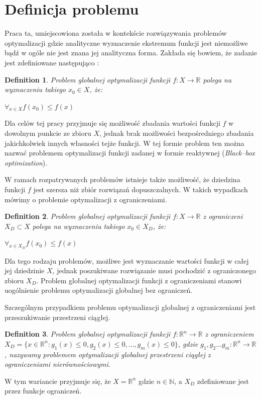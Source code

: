 \documentclass[12pt,a4paper]{report}
\begin{document}
\section{Definicja problemu}
\label{ProblemDefinition}
\par{
Praca ta, umiejscowiona została w kontekście rozwiązywania problemów optymalizacji gdzie analityczne wyznaczenie ekstremum funkcji jest niemożliwe bądź w ogóle nie jest znana jej analityczna forma. Zakłada się bowiem, że zadanie jest zdefiniowane następująco \cite{StrojnowskiOptymalizacja2}:
}
\newtheorem{OptDefinition}{Definition}
\par{
\begin{OptDefinition}
Problem globalnej optymalizacji funkcji $f: X \rightarrow \mathbb{R}$ polega na wyznaczeniu takiego $x_0 \in X$, że:
\begin{center}
	$\forall_{x \in X} f(x_0) \leq f(x)$
\end{center}
\end{OptDefinition}
\par{
Dla celów tej pracy przyjmuje się możliwość zbadania wartości funkcji $f$ w dowolnym punkcie ze zbioru $X$, jednak brak możliwości bezpośredniego zbadania jakichkolwiek innych własności tejże funkcji. W tej formie problem ten można nazwać problemem optymalizacji funkcji zadanej w formie reaktywnej (\emph{Black--box optimization}).
}
\par{
W ramach rozpatrywanych problemów istnieje także możliwość, że dziedzina funkcji $f$ jest szersza niż zbiór rozwiązań dopuszczalnych. W takich wypadkach mówimy o problemie optymalizacji z ograniczeniami.
\begin{OptDefinition}
Problem globalnej optymalizacji funkcji $f: X \rightarrow \mathbb{R}$ z ograniczeni $X_D \subset X$ polega na wyznaczeniu takiego $x_0 \in X_D$, że:
\begin{center}
	$\forall_{x \in X_D} f(x_0) \leq f(x)$
\end{center}
\end{OptDefinition}
Dla tego rodzaju problemów, możliwe jest wyznaczanie wartości funkcji w całej jej dziedzinie $X$, jednak poszukiwane rozwiązanie musi pochodzić z ograniczonego zbioru $X_D$.
Problem globalnej optymalizacji funkcji z ograniczeniami stanowi uogólnienie problemu optymalizacji globalnej bez ograniczeń.
}
\par{
Szczególnym przypadkiem problemu optymalizacji globalnej z ograniczeniami jest przeszukiwanie przestrzeni ciągłej. 
\begin{OptDefinition}
Problem globalnej optymalizacji funkcji $f: \mathbb{R}^n \rightarrow \mathbb{R}$ z ograniczeniem $X_D = \{x \in \mathbb{R}^n: g_1(x) \leq 0, g_2(x) \leq 0, \ldots, g_m(x) \leq 0\}$, gdzie $g_1, g_2 \ldots g_m: \mathbb{R}^n \rightarrow \mathbb{R}$, nazywamy problemem optymalizacji globalnej przestrzeni ciągłej z ograniczeniami nierównościowymi.
\end{OptDefinition}
W tym wariancie przyjmuje się, że $X = \mathbb{R}^n$ gdzie $n \in \mathbb{N}$, a $X_D$ zdefiniowane jest przez funkcje ograniczeń.
}

}
\end{document}
